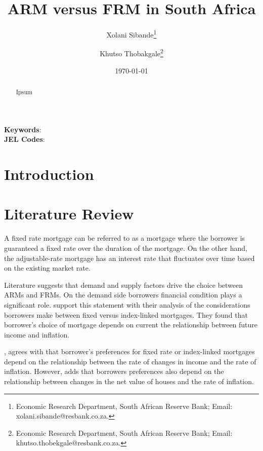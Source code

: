 \documentclass[
  letterpaper,
  DIV=11,
  numbers=noendperiod]{scrartcl}
\author{}
\date{}
\begin{document}
\title{ARM versus FRM in South Africa}

\author {Xolani Sibande\footnote{Economic Research Department, South African Reserve Bank; Email: xolani.sibande@resbank.co.za.} \and
Khutso Thobakgale\footnote{Economic Research Department, South African Reserve Bank; Email: khutso.thobekgale@resbank.co.za.}}


\date{\today}
\maketitle

\begin{abstract}
Ipsum

\end{abstract}

\noindent\textbf{Keywords}: \\
\textbf{JEL Codes}: 
\newpage

\section{Introduction}\label{introduction}

\section{Literature Review}\label{literature-review}

A fixed rate mortgage can be referred to as a mortgage where the
borrower is guaranteed a fixed rate over the duration of the mortgage.
On the other hand, the adjustable-rate mortgage has an interest rate
that fluctuates over time based on the existing market rate.

Literature suggests that demand and supply factors drive the choice
between ARMs and FRMs. On the demand side borrowers financial condition
plays a significant role. \citet{baesel1980allocation} support this
statement with their analysis of the considerations borrowers make
between fixed versus index-linked mortgages. They found that borrower's
choice of mortgage depends on current the relationship between future
income and inflation.

\citet{statman1982fixed}, agrees with \citet{baesel1980allocation} that
borrower's preferences for fixed rate or index-linked mortgages depend
on the relationship between the rate of changes in income and the rate
of inflation. However, \citet{statman1982fixed} adds that borrowers
preferences also depend on the relationship between changes in the net
value of houses and the rate of inflation.
\end{document}
